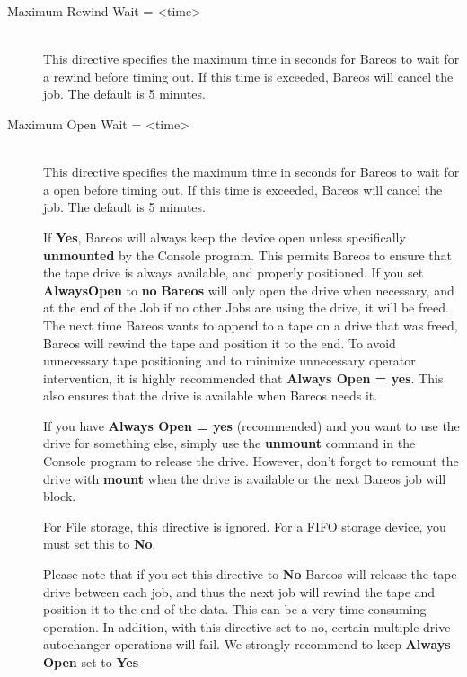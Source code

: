 \begin{description}
\item [Maximum Rewind Wait = {\textless}time{\textgreater}] \hfill \\
This directive specifies the maximum time in seconds for Bareos to wait
for a rewind before timing out.  If this time is exceeded,
Bareos will cancel the job.  The default is 5 minutes.

\item [Maximum Open Wait = {\textless}time{\textgreater}] \hfill \\
This directive specifies the maximum time in seconds for Bareos to wait
for a open before timing out.  If this time is exceeded,
Bareos will cancel the job.  The default is 5 minutes.

If {\bf Yes}, Bareos will always keep the device open unless
specifically {\bf unmounted} by the Console program.  This permits
Bareos to ensure that the tape drive is always available, and properly
positioned. If you set
{\bf AlwaysOpen} to {\bf no} {\bf Bareos} will only open the
drive when necessary, and at the end of the Job if no other Jobs are
using the drive, it will be freed.  The next time Bareos wants to append
to a tape on a drive that was freed, Bareos will rewind the tape and
position it to the end.  To avoid unnecessary tape positioning and to
minimize unnecessary operator intervention, it is highly recommended
that {\bf Always Open = yes}.  This also ensures that the drive is
available when Bareos needs it.

If you have {\bf Always Open = yes} (recommended) and you want to use the
drive for something else, simply use the {\bf unmount} command in the
Console program to release the drive. However, don't forget to remount the
drive with {\bf mount} when the drive is available or the next Bareos job
will block.

For File storage, this directive is ignored. For a FIFO storage  device, you
must set this to {\bf No}.

Please note that if you set this directive to {\bf No} Bareos  will release
the tape drive between each job, and thus the next job  will rewind the tape
and position it to the end of the data. This  can be a very time consuming
operation. In addition, with this directive set to no, certain multiple
drive autochanger operations will fail.  We strongly recommend to keep
{\bf Always Open} set to {\bf Yes}



\end{description}
